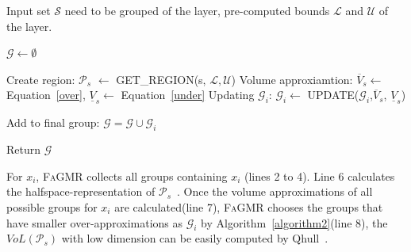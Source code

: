 \documentclass[runningheads]{llncs}
\newcommand{\ourtool}{\textsc{FaGMR}\xspace}
\begin{document}
\begin{algorithm}[!h]
   \caption{\ourtool Grouping Strategy for a Layer}
   \label{algorithm1} 
\begin{algorithmic}[1]
    Input set $\mathcal{S}$ need to be grouped of the layer,
 pre-computed bounds $\mathcal{L}$ and $\mathcal{U}$ of the layer.


   \STATE  $\mathcal{G} \leftarrow \emptyset$

	
   \STATE Create region: $\mathcal{P}_{s}$ $\leftarrow$ GET\_REGION(s, $\mathcal{L}, \mathcal{U}$)
   \STATE Volume approxiamtion: $\overline{V}_{s} \leftarrow$ Equation~\ref{over}, $\underline{V}_{s} \leftarrow$ Equation~\ref{under}
   \STATE Updating $\mathcal{G}_{i}$: $\mathcal{G}_{i} \leftarrow$ UPDATE($\mathcal{G}_{i}$,$\overline{V}_{s}$, $\underline{V}_{s}$)  

   \ENDIF

   
	
   \STATE Add to final group: $\mathcal{G} = \mathcal{G} \cup \mathcal{G}_{i}$

   \ENDIF

   \ENDFOR
   \ENDFOR
   \STATE Return $\mathcal{G}$
\end{algorithmic}
\end{algorithm}
For $x_{i}$, \ourtool collects all groups containing $x_{i}$ (lines 2 to 4).
Line 6 calculates the halfspace-representation of $\mathcal{P}_{s}$~\cite{gaubert2011minimal}. 
Once the volume approximations of all possible groups for $x_{i}$ are calculated(line 7),
\ourtool chooses the groups that have smaller over-approximations as $\mathcal{G}_{i}$ by Algorithm~\ref{algorithm2}(line 8),
the $VoL(\mathcal{P}_{s})$ with low dimension can be easily computed by Qhull~\cite{barber2013qhull}. 
\end{document}
